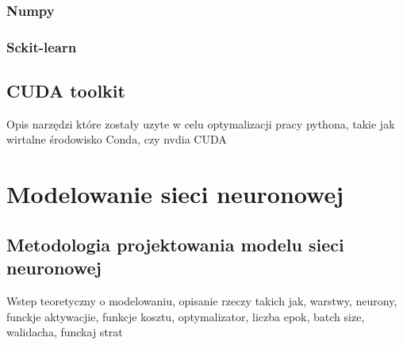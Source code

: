 \documentclass[a4paper,twoside,12pt]{book}
\begin{document}
\subsection{Numpy}
\subsection{Sckit-learn}
\section{CUDA toolkit}
Opis narzędzi które zostały uzyte w celu optymalizacji pracy pythona, takie jak wirtalne środowisko Conda, czy nvdia CUDA



\chapter{Modelowanie sieci neuronowej}
\label{ch:04}
\section{Metodologia projektowania modelu sieci neuronowej}
Wstep teoretyczny o modelowaniu, opisanie rzeczy takich jak, warstwy, neurony, funckje aktywacjie, funkcje kosztu, optymalizator, liczba epok, batch size, walidacha, funckaj strat

\newpage
\end{document}
